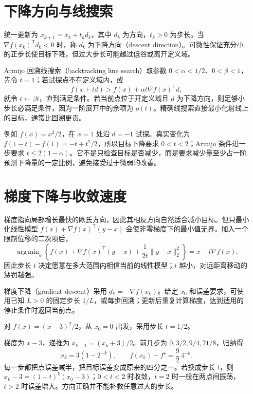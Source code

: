 \section{下降方向与线搜索}

统一更新为 $x_{k+1}=x_k+t_kd_k$，其中 $d_k$ 为方向，$t_k>0$ 为步长。当 $\nabla f(x_k)^{\mathsf T}d_k<0$ 时，称 $d_k$ 为下降方向（descent direction）。可微性保证充分小的正步长使目标下降，但过大步长可能越过低谷或离开定义域。

Armijo 回溯线搜索（backtracking line search）取参数 $0<\alpha<1/2$、$0<\beta<1$，先令 $t=1$；若试探点不在定义域内，或
\[
 f(x+td)>f(x)+\alpha t\nabla f(x)^{\mathsf T}d,
\]
就令 $t\leftarrow\beta t$，直到满足条件。若当前点位于开定义域且 $d$ 为下降方向，则足够小步长必满足条件，因为一阶展开中的余项为 $o(t)$。精确线搜索直接最小化射线上的目标，通常比回溯更贵。

例如 $f(x)=x^2/2$，在 $x=1$ 处沿 $d=-1$ 试探。真实变化为 $f(1-t)-f(1)=-t+t^2/2$，所以目标下降要求 $0<t<2$；Armijo 条件进一步要求 $t\leq2(1-\alpha)$。它不是只检查目标是否减少，而是要求减少量至少占一阶预测下降量的一定比例，避免接受过于微弱的改善。

\section{梯度下降与收敛速度}

\label{sec:co-gradient}

梯度指向局部增长最快的欧氏方向，因此其相反方向自然适合减小目标。但只最小化线性模型 $f(x)+\nabla f(x)^{\mathsf T}(y-x)$ 会使非零梯度下的最小值无界。加入一个限制位移的二次项后，
\[
 \mathop{\mathrm{arg\,min}}_y
 \left\{f(x)+\nabla f(x)^{\mathsf T}(y-x)+\frac1{2t}\|y-x\|_2^2\right\}
 =x-t\nabla f(x).
\]
因此步长 $t$ 决定愿意在多大范围内相信当前的线性模型；$t$ 越小，对远距离移动的惩罚越强。

梯度下降（gradient descent）采用 $d_k=-\nabla f(x_k)$。给定 $x_0$ 和误差要求，可使用已知 $L>0$ 的固定步长 $1/L$，或每步回溯；更新后重复计算梯度，达到适用的停止条件时返回当前点。

\begin{example}[手算一次完整的梯度迭代]
对 $f(x)=(x-3)^2/2$，从 $x_0=0$ 出发，采用步长 $t=1/2$。
\end{example}
\begin{solve}
梯度为 $x-3$，递推为 $x_{k+1}=(x_k+3)/2$。前几步为 $0,3/2,9/4,21/8$，归纳得
\[
 x_k=3(1-2^{-k}),\qquad
 f(x_k)-f^\star=\frac92\,4^{-k}.
\]
每一步都把点误差减半，把目标误差变成原来的四分之一。若换成步长 $t$，则 $x_k-3=(1-t)^k(x_0-3)$；$0<t<2$ 时收敛，$t=2$ 时一般在两点间振荡，$t>2$ 时误差增大。方向正确并不能补救任意过大的步长。
\end{solve}

